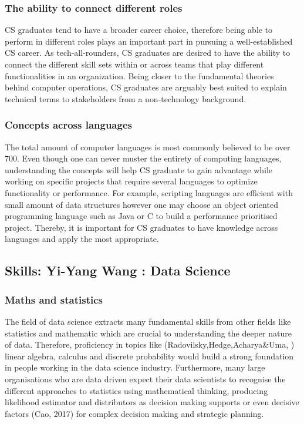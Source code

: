 \documentclass[a4paper, 11pt]{report}
\begin{document}
\subsubsection{The ability to connect different roles}
CS graduates tend to have a broader career choice, therefore being able to perform in different roles plays an important part in pursuing a well-established CS career. As tech-all-rounders, CS graduates are desired to have the ability to connect the different skill sets within or across teams that play different functionalities in an organization. Being closer to the fundamental theories behind computer operations, CS graduates are arguably best suited to explain technical terms to stakeholders from a non-technology background.
\subsubsection{Concepts across languages}
The total amount of computer languages is most commonly believed to be over 700. Even though one can never muster the entirety of computing languages, understanding the concepts will help CS graduate to gain advantage while working on specific projects that require several languages to optimize functionality or performance. For example, scripting languages are efficient with small amount of data structures however one may choose an object oriented programming language such as Java or C to build a performance prioritised project. Thereby, it is important for CS graduates to have knowledge across languages and apply the most appropriate.

\subsection{Skills: Yi-Yang Wang : Data Science}

\subsubsection{Maths and statistics}
The field of data science extracts many fundamental skills from other fields like statistics and mathematic which are crucial to understanding the deeper nature of data. Therefore, proficiency in topics like (Radovilsky,Hedge,Acharya&Uma, ) linear algebra, calculus and discrete probability would build a strong foundation in people working in the data science industry. Furthermore, many large organisations who are data driven expect their data scientists to recognise the different approaches to statistics using mathematical thinking, producing likelihood estimator and distributors as decision making supports or even decisive factors (Cao, 2017) for complex decision making and strategic planning. 
\end{document}
